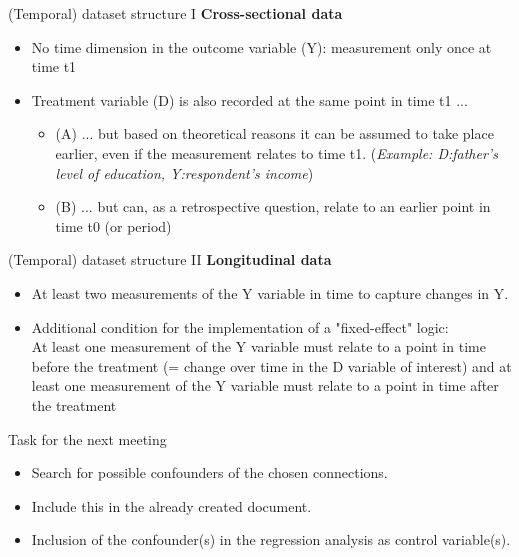 \documentclass{beamer}\usepackage[]{graphicx}\usepackage[]{color}
\begin{document}
\begin{frame}{(Temporal) dataset structure I}
\textbf{Cross-sectional data}
  \begin{itemize}
    \item No time dimension in the outcome variable (Y): measurement only once at time t1
    \item Treatment variable (D) is also recorded at the same point in time t1 ... \\[0.5em]
      \begin{itemize}  
        \item (A) ... but based on theoretical reasons it can be assumed to take place earlier, even if the measurement relates to time t1. (\textit{Example: D:father's level of education, Y:respondent's income}) \\[0.5em]
        \item (B) ... but can, as a retrospective question, relate to an earlier point in time t0 (or period)
      \end{itemize}
  \end{itemize}
\end{frame}


\begin{frame}{(Temporal) dataset structure II}
\textbf{Longitudinal data}
  \begin{itemize}
    \item At least two measurements of the Y variable in time to capture changes in Y.
    \item Additional condition for the implementation of a "fixed-effect" logic: \\
    At least one measurement of the Y variable must relate to a point in time before the treatment (= change over time in the D variable of interest) and at least one measurement of the Y variable must relate to a point in time after the treatment
  \end{itemize}
\end{frame}



\begin{frame}{Task for the next meeting}
\begin{itemize}
  \item Search for possible confounders of the chosen connections. \\[1em]
  \item Include this in the already created document. \\[1em]
  \item Inclusion of the confounder(s) in the regression analysis as control variable(s). \\[1em]
\end{itemize}
\end{frame} 



\begin{frame}

  
\end{frame} 
\end{document}
